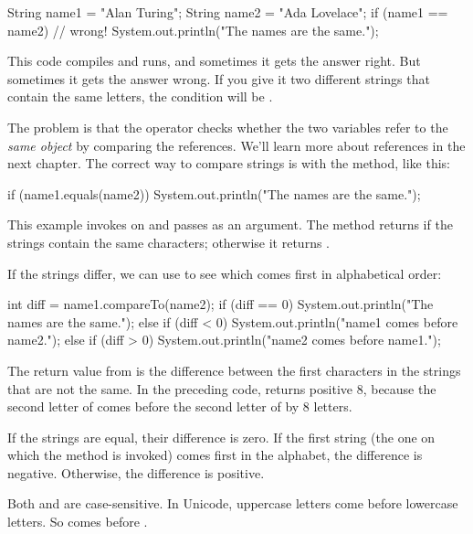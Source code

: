 \begin{code}
String name1 = "Alan Turing";
String name2 = "Ada Lovelace";
if (name1 == name2) {                 // wrong!
    System.out.println("The names are the same.");
}
\end{code}

This code compiles and runs, and sometimes it gets the answer right.
But sometimes it gets the answer wrong.
If you give it two different strings that contain the same letters, the condition will be .

The problem is that the \java{==} operator checks whether the two variables refer to the {\em same object} by comparing the references.
We'll learn more about references in the next chapter.
The correct way to compare strings is with the  method, like this:

\begin{code}
if (name1.equals(name2)) {
    System.out.println("The names are the same.");
}
\end{code}

This example invokes  on  and passes  as an argument.
The  method returns  if the strings contain the same characters; otherwise it returns .


If the strings differ, we can use  to see which comes first in alphabetical order:

\begin{code}
int diff = name1.compareTo(name2);
if (diff == 0) {
    System.out.println("The names are the same.");
} else if (diff < 0) {
    System.out.println("name1 comes before name2.");
} else if (diff > 0) {
    System.out.println("name2 comes before name1.");
}
\end{code}

The return value from  is the difference between the first characters in the strings that are not the same.
In the preceding code,  returns positive 8, because the second letter of  comes before the second letter of  by 8 letters.

If the strings are equal, their difference is zero.
If the first string (the one on which the method is invoked) comes first in the alphabet, the difference is negative.
Otherwise, the difference is positive.


Both  and  are case-sensitive.
In Unicode, uppercase letters come before lowercase letters.
So  comes before .


